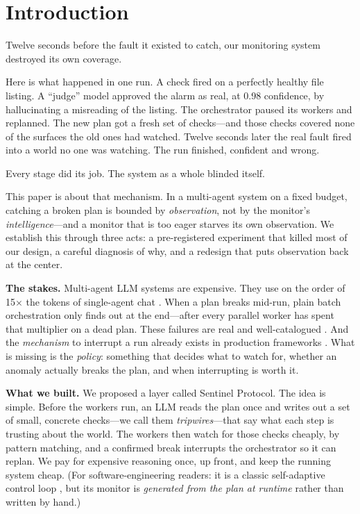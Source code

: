 \documentclass[acmsmall,screen]{acmart}
\begin{document}

\maketitle

\section{Introduction}
Twelve seconds before the fault it existed to catch, our monitoring system
destroyed its own coverage.

Here is what happened in one run. A check fired on a perfectly healthy file
listing. A ``judge'' model approved the alarm as real, at 0.98 confidence, by
hallucinating a misreading of the listing. The orchestrator paused its workers
and replanned. The new plan got a fresh set of checks---and those checks
covered none of the surfaces the old ones had watched. Twelve seconds later the
real fault fired into a world no one was watching. The run finished, confident
and wrong.

Every stage did its job. The system as a whole blinded itself.

This paper is about that mechanism. In a multi-agent system on a fixed budget,
catching a broken plan is bounded by \emph{observation}, not by the monitor's
\emph{intelligence}---and a monitor that is too eager starves its own
observation. We establish this through three acts: a pre-registered experiment
that killed most of our design, a careful diagnosis of why, and a redesign that
puts observation back at the center.

\textbf{The stakes.} Multi-agent LLM systems are expensive. They use on the
order of 15$\times$ the tokens of single-agent chat \cite{ref27}. When a plan
breaks mid-run, plain batch orchestration only finds out at the end---after
every parallel worker has spent that multiplier on a dead plan. These failures
are real and well-catalogued \cite{ref14, ref16}. And the \emph{mechanism} to
interrupt a run already exists in production frameworks \cite{ref22}. What is
missing is the \emph{policy}: something that decides what to watch for, whether
an anomaly actually breaks the plan, and when interrupting is worth it.

\textbf{What we built.} We proposed a layer called Sentinel Protocol. The idea
is simple. Before the workers run, an LLM reads the plan once and writes out a
set of small, concrete checks---we call them \emph{tripwires}---that say what
each step is trusting about the world. The workers then watch for those checks
cheaply, by pattern matching, and a confirmed break interrupts the orchestrator
so it can replan. We pay for expensive reasoning once, up front, and keep the
running system cheap. (For software-engineering readers: it is a classic
self-adaptive control loop \cite{ref23}, but its monitor is \emph{generated
from the plan at runtime} rather than written by hand.)
\end{document}
